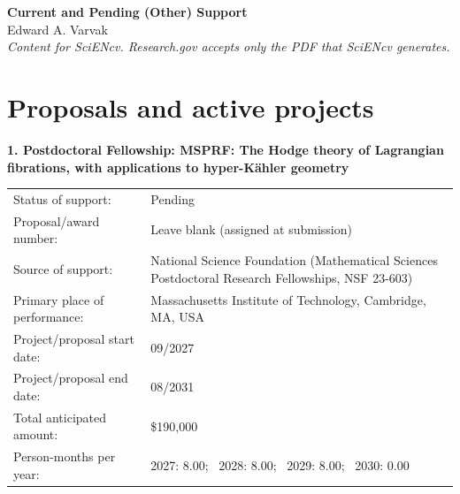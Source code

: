 \documentclass[11pt]{article}
\begin{document}
\begin{center}
  {\Large\bfseries Current and Pending (Other) Support}\\[5pt]
  Edward A. Varvak\\[3pt]
  \emph{Content for SciENcv. Research.gov accepts only the PDF that SciENcv generates.}
\end{center}

\section*{Proposals and active projects}


\textbf{1. Postdoctoral Fellowship: MSPRF: The Hodge theory of Lagrangian fibrations, with
applications to hyper-K\"ahler geometry}

\begin{tabularx}{\textwidth}{@{}p{2.2in}X@{}}
Status of support: & Pending \\
Proposal/award number: & Leave blank (assigned at submission) \\
Source of support: & National Science Foundation (Mathematical Sciences Postdoctoral
Research Fellowships, NSF 23-603) \\
Primary place of performance: & Massachusetts Institute of Technology, Cambridge, MA, USA \\
Project/proposal start date: & 09/2027 \\
Project/proposal end date: & 08/2031 \\
Total anticipated amount: & \$190,000 \\
Person-months per year: & 2027: 8.00; \ 2028: 8.00; \ 2029: 8.00; \ 2030: 0.00 \\
\end{tabularx}
\end{document}
